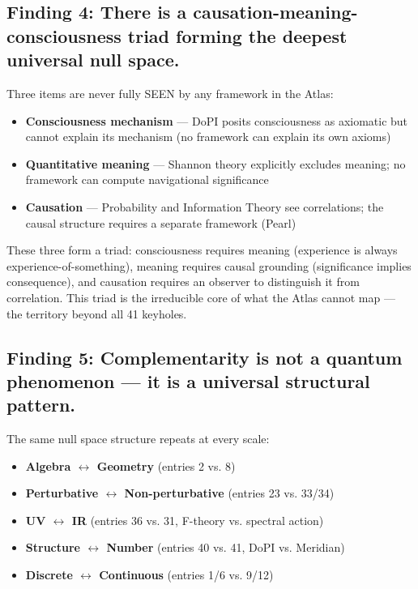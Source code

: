 \subsection*{Finding 4: There is a causation-meaning-consciousness triad forming the deepest universal null space.}


Three items are never fully SEEN by any framework in the Atlas:

\begin{itemize}[nosep,leftmargin=*]
  \item \textbf{Consciousness mechanism} — DoPI posits consciousness as axiomatic but cannot explain its mechanism (no framework can explain its own axioms)
  \item \textbf{Quantitative meaning} — Shannon theory explicitly excludes meaning; no framework can compute navigational significance
  \item \textbf{Causation} — Probability and Information Theory see correlations; the causal structure requires a separate framework (Pearl)
\end{itemize}


These three form a triad: consciousness requires meaning (experience is always experience-of-something), meaning requires causal grounding (significance implies consequence), and causation requires an observer to distinguish it from correlation. This triad is the irreducible core of what the Atlas cannot map — the territory beyond all 41 keyholes.


\subsection*{Finding 5: Complementarity is not a quantum phenomenon — it is a universal structural pattern.}


The same null space structure repeats at every scale:

\begin{itemize}[nosep,leftmargin=*]
  \item \textbf{Algebra $\leftrightarrow$ Geometry} (entries 2 vs. 8)
  \item \textbf{Perturbative $\leftrightarrow$ Non-perturbative} (entries 23 vs. 33/34)
  \item \textbf{UV $\leftrightarrow$ IR} (entries 36 vs. 31, F-theory vs. spectral action)
  \item \textbf{Structure $\leftrightarrow$ Number} (entries 40 vs. 41, DoPI vs. Meridian)
  \item \textbf{Discrete $\leftrightarrow$ Continuous} (entries 1/6 vs. 9/12)
\end{itemize}


